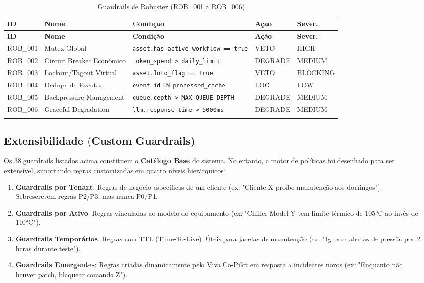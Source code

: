 \documentclass[12pt, a4paper]{article}
\begin{document}
{\small
\begin{longtable}{|p{2cm}|p{2.8cm}|p{5.5cm}|p{2cm}|p{2cm}|}
\hline
\textbf{ID} & \textbf{Nome} & \textbf{Condição} & \textbf{Ação} & \textbf{Sever.} \\ \hline
\endfirsthead
\hline
\textbf{ID} & \textbf{Nome} & \textbf{Condição} & \textbf{Ação} & \textbf{Sever.} \\ \hline
\endhead

ROB\_001 & Mutex Global & \texttt{asset.has\_active\_workflow == true} & VETO & HIGH \\ \hline

ROB\_002 & Circuit Breaker Econômico & \texttt{token\_spend > daily\_limit} & DEGRADE & MEDIUM \\ \hline

ROB\_003 & Lockout/Tagout Virtual & \texttt{asset.loto\_flag == true} & VETO & BLOCKING \\ \hline

ROB\_004 & Dedupe de Eventos & \texttt{event.id} IN \texttt{processed\_cache} & LOG & LOW \\ \hline

ROB\_005 & Backpressure Management & \texttt{queue.depth > MAX\_QUEUE\_DEPTH} & DEGRADE & MEDIUM \\ \hline

ROB\_006 & Graceful Degradation & \texttt{llm.response\_time > 5000ms} & DEGRADE & MEDIUM \\ \hline

\caption{Guardrails de Robustez (ROB\_001 a ROB\_006)}
\end{longtable}
}

\subsection{Extensibilidade (Custom Guardrails)}

Os 38 guardrails listados acima constituem o \textbf{Catálogo Base} do sistema. No entanto, o motor de políticas foi desenhado para ser extensível, suportando regras customizadas em quatro níveis hierárquicos:

\begin{enumerate}
    \item \textbf{Guardrails por Tenant}: Regras de negócio específicas de um cliente (ex: "Cliente X proíbe manutenção aos domingos"). Sobrescrevem regras P2/P3, mas nunca P0/P1.
    \item \textbf{Guardrails por Ativo}: Regras vinculadas ao modelo do equipamento (ex: "Chiller Model Y tem limite térmico de 105°C ao invés de 110°C").
    \item \textbf{Guardrails Temporários}: Regras com TTL (Time-To-Live). Úteis para janelas de manutenção (ex: "Ignorar alertas de pressão por 2 horas durante teste").
    \item \textbf{Guardrails Emergentes}: Regras criadas dinamicamente pelo Viva Co-Pilot em resposta a incidentes novos (ex: "Enquanto não houver patch, bloquear comando Z").
\end{enumerate}
\end{document}
